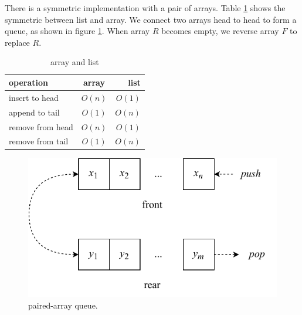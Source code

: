 \documentclass[b5paper]{article}
\begin{document}

There is a symmetric implementation with a pair of arrays. Table \ref{tab:array-list-comp} shows the symmetric between list and array. We connect two arrays head to head to form a queue, as shown in figure \ref{fig:horseshoe-array}. When array $R$ becomes empty, we reverse array $F$ to replace $R$.

\begin{table}[htbp]
\centering
\begin{tabular}{l | c | r}
  \hline
  operation & array & list \\
  \hline
  insert to head & $O(n)$ & $O(1)$ \\
  append to tail & $O(1)$ & $O(n)$ \\
  remove from head & $O(n)$ & $O(1)$ \\
  remove from tail & $O(1)$ & $O(n)$ \\
  \hline
\end{tabular}
\caption{array and list}
\label{tab:array-list-comp}
\end{table}

\begin{figure}[htbp]
  \centering
  \includegraphics[scale=0.6]{img/paired-arrayq}
  \caption{paired-array queue.}
  \label{fig:horseshoe-array}
\end{figure}

\begin{Exercise}
\end{Exercise}
\end{document}
